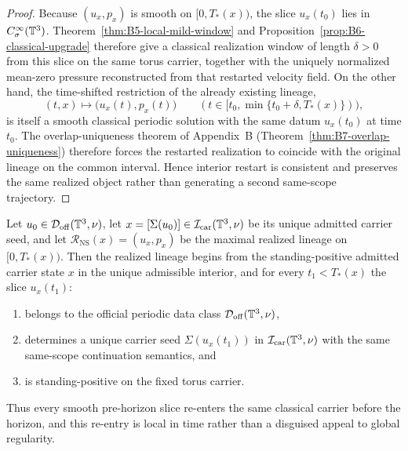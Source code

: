 \begin{proof}
Because $(u_x,p_x)$ is smooth on $[0,T_*(x))$, the slice $u_x(t_0)$ lies in $C^\infty_\sigma(\mathbb{T}^3)$. Theorem~\ref{thm:B5-local-mild-window} and Proposition~\ref{prop:B6-classical-upgrade} therefore give a classical realization window of length $\delta>0$ from this slice on the same torus carrier, together with the uniquely normalized mean-zero pressure reconstructed from that restarted velocity field. On the other hand, the time-shifted restriction of the already existing lineage,
\[
(t,x)\mapsto \bigl(u_x(t),p_x(t)\bigr)\qquad (t\in[t_0,\min\{t_0+\delta,T_*(x)\})),
\]
is itself a smooth classical periodic solution with the same datum $u_x(t_0)$ at time $t_0$. The overlap-uniqueness theorem of Appendix~B (Theorem~\ref{thm:B7-overlap-uniqueness}) therefore forces the restarted realization to coincide with the original lineage on the common interval. Hence interior restart is consistent and preserves the same realized object rather than generating a second same-scope trajectory.
\end{proof}

\begin{manualcorollary}
\label{cor:pre-horizon-slice-reentry}\label{lem:propagation-standing-positive-slices}
Let $u_0\in\mathcal D_{\mathrm{off}}(\mathbb{T}^3,\nu)$, let $x=[\Sigma(u_0)]\in\mathcal I_{\mathrm{car}}(\mathbb{T}^3,\nu)$ be its unique admitted carrier seed, and let $\mathcal R_{\mathrm{NS}}(x)=(u_x,p_x)$ be the maximal realized lineage on $[0,T_*(x))$. Then the realized lineage begins from the standing-positive admitted carrier state $x$ in the unique admissible interior, and for every $t_1<T_*(x)$ the slice $u_x(t_1)$:
\begin{enumerate}[label=(\roman*), leftmargin=2.2em]
\item belongs to the official periodic data class $\mathcal D_{\mathrm{off}}(\mathbb{T}^3,\nu)$,
\item determines a unique carrier seed $\Sigma(u_x(t_1))$ in $\mathcal I_{\mathrm{car}}(\mathbb{T}^3,\nu)$ with the same same-scope continuation semantics, and
\item is standing-positive on the fixed torus carrier.
\end{enumerate}
Thus every smooth pre-horizon slice re-enters the same classical carrier before the horizon, and this re-entry is local in time rather than a disguised appeal to global regularity.
\end{manualcorollary}

